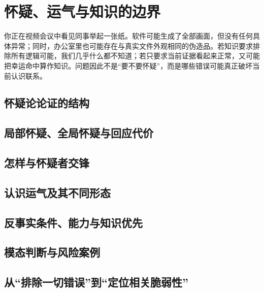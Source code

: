 \chapter{怀疑、运气与知识的边界}

\begin{openingcase}
你正在视频会议中看见同事举起一张纸。软件可能生成了全部画面，但没有任何具体异常；同时，办公室里也可能存在与真实文件外观相同的伪造品。若知识要求排除所有逻辑可能，我们几乎什么都不知道；若只要求当前证据看起来正常，又可能把幸运命中算作知识。问题因此不是“要不要怀疑”，而是哪些错误可能真正破坏当前认识联系。
\end{openingcase}

\section{怀疑论论证的结构}


\section{局部怀疑、全局怀疑与回应代价}


\section{怎样与怀疑者交锋}



\section{认识运气及其不同形态}


\section{反事实条件、能力与知识优先}


\section{模态判断与风险案例}



\section{从“排除一切错误”到“定位相关脆弱性”}


